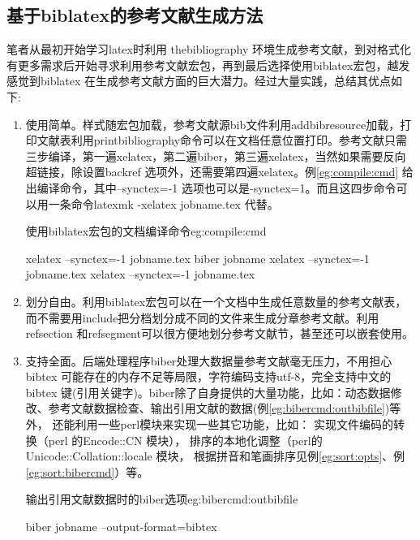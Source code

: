 \subsection{基于biblatex的参考文献生成方法}
笔者从最初开始学习latex时利用 thebibliography 环境生成参考文献，到对格式化有更多需求后开始寻求利用参考文献宏包，再到最后选择使用biblatex宏包，越发感觉到biblatex 在生成参考文献方面的巨大潜力。经过大量实践，总结其优点如下:
\begin{enumerate}
\item 使用简单。样式随宏包加载，参考文献源bib文件利用addbibresource加载，打印文献表利用printbibliography命令可以在文档任意位置打印。参考文献只需三步编译，第一遍xelatex，第二遍biber，第三遍xelatex，当然如果需要反向超链接，除设置backref 选项外，还需要第四遍xelatex。例\ref{eg:compile:cmd} 给出编译命令，其中--synctex=-1 选项也可以是-synctex=1。而且这四步命令可以用一条命令latexmk -xelatex jobname.tex 代替。

    \begin{example}{使用biblatex宏包的文档编译命令}{eg:compile:cmd}
    \begin{texlist}
    xelatex --synctex=-1 jobname.tex
    biber jobname
    xelatex --synctex=-1 jobname.tex
    xelatex --synctex=-1 jobname.tex
    \end{texlist}
    \end{example}

\item 划分自由。利用biblatex宏包可以在一个文档中生成任意数量的参考文献表，而不需要用include把分档划分成不同的文件来生成分章参考文献。利用refsection 和refsegment可以很方便地划分参考文献节，甚至还可以嵌套使用。

\item 支持全面。后端处理程序biber处理大数据量参考文献毫无压力，不用担心bibtex 可能存在的内存不足等局限，字符编码支持utf-8，完全支持中文的bibtex 键(引用关键字)。biber除了自身提供的大量功能，比如：动态数据修改、参考文献数据检查、输出引用文献的数据(例\ref{eg:bibercmd:outbibfile})等外，
    还能利用一些perl模块来实现一些其它功能，比如：
    实现文件编码的转换（perl 的Encode::CN 模块），
    排序的本地化调整（perl的Unicode::Collation::locale 模块，
    根据拼音和笔画排序见例\ref{eg:sort:opts}、例\ref{eg:sort:bibercmd}）等。

    \begin{example}{输出引用文献数据时的biber选项}{eg:bibercmd:outbibfile}
    \begin{texlist}
    biber jobname --output-format=bibtex
    \end{texlist}
    \end{example}


\end{enumerate}
